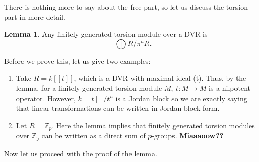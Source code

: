 \documentclass[12 pt]{article}
\theoremstyle{definition}
\newtheorem{lemma}[thm]{Lemma}
\renewcommand{\(}{\left(}
\renewcommand{\)}{\right)}
\newcommand\zz{\mathbb{Z}}
\newcommand\fp{{\mathfrak p}}
\begin{document}
There is nothing more to say about the free part, so let us discuss the torsion part in more detail.

\begin{lemma} Any finitely generated torsion module over a DVR is
\[\bigoplus R/\pi^nR.\]
\label{dvr fin gen tor module struct}
\end{lemma}
Before we prove this, let us give two examples:
\begin{enumerate}
\item Take $R=k[[t]]$, which is a DVR with maximal ideal (t). Thus, by the lemma, for a finitely generated torsion module $M$, $t:M \to M$ is a nilpotent operator. However, $k[[t]]/t^n$ is a Jordan block so we are exactly saying that linear transformations can be written in Jordan block form.
\item Let $R=\zz_p$. Here the lemma implies that finitely generated torsion modules over $\zz_\fp$ can be written as a direct sum of $p$-groups. \textcolor[rgb]{0.98,0.00,0.00}{\textbf{Miaaaoow??}}
\end{enumerate}
Now let us proceed with the proof of the lemma.
\end{document}
